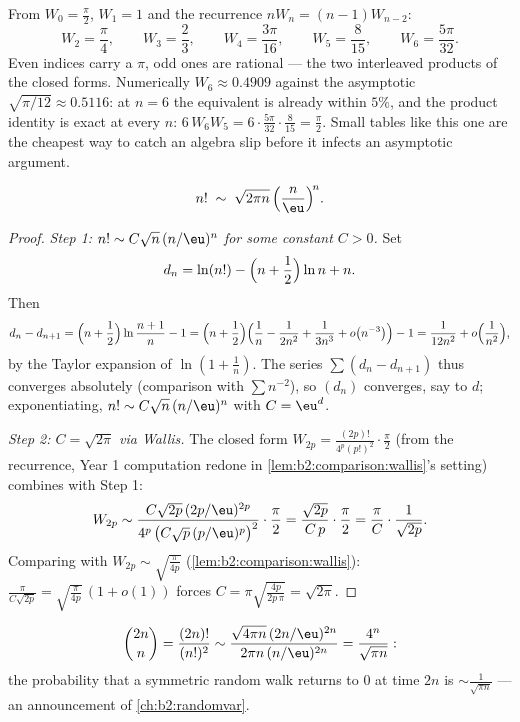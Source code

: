 \begin{example}\label{ex:b2:comparison:wallisvalues}
From $W_0 = \frac\pi2$, $W_1 = 1$ and the recurrence $nW_n =
(n-1)W_{n-2}$:
\[
W_2 = \frac\pi4, \qquad
W_3 = \frac23, \qquad
W_4 = \frac{3\pi}{16}, \qquad
W_5 = \frac{8}{15}, \qquad
W_6 = \frac{5\pi}{32}.
\]
Even indices carry a $\pi$, odd ones are rational --- the two
interleaved products of the closed forms. Numerically $W_6
\approx 0.4909$ against the asymptotic
$\sqrt{\pi/12} \approx 0.5116$: at $n = 6$ the equivalent is
already within $5\%$, and the product identity is exact at every
$n$: $6\,W_6W_5 = 6\cdot\frac{5\pi}{32}\cdot\frac8{15} =
\frac\pi2$. Small tables like this one are the cheapest way to
catch an algebra slip before it infects an asymptotic argument.
\end{example}

\begin{theorem}[Stirling]\label{thm:b2:comparison:stirling}
\[
n! \;\sim\; \sqrt{2\pi n}\, \Bigl(\frac{n}{\eu}\Bigr)^{\!n}
.\index{Stirling's formula}
\]
\end{theorem}

\begin{proof}
\emph{Step 1: $n! \sim C \sqrt n\, (n/\eu)^n$ for some constant $C >
0$.} Set
\[
d_n = \ln(n!) - \Bigl(n + \frac12\Bigr)\ln n + n .
\]
Then
\[
d_n - d_{n+1}
= \Bigl(n + \frac12\Bigr) \ln\frac{n+1}{n} - 1
= \Bigl(n + \frac12\Bigr)\Bigl(\frac1n - \frac{1}{2n^2} +
\frac{1}{3n^3} + o\bigl(n^{-3}\bigr)\Bigr) - 1
= \frac{1}{12n^2} + o\Bigl(\frac{1}{n^2}\Bigr),
\]
by the Taylor expansion of $\ln(1 + \frac1n)$. The series $\sum (d_n
- d_{n+1})$ thus converges absolutely (comparison with $\sum
n^{-2}$), so $(d_n)$ converges, say to $d$; exponentiating, $n! \sim
C\sqrt n\,(n/\eu)^n$ with $C = \eu^{d}$.

\emph{Step 2: $C = \sqrt{2\pi}$ via Wallis.} The closed form $W_{2p}
= \frac{(2p)!}{4^p (p!)^2}\cdot\frac\pi2$ (from the recurrence,
Year 1 computation redone in \cref{lem:b2:comparison:wallis}'s
setting) combines with Step 1:
\[
W_{2p} \sim \frac{C\sqrt{2p}\,(2p/\eu)^{2p}}
{4^p\,\bigl(C\sqrt p\,(p/\eu)^p\bigr)^2}\cdot\frac{\pi}{2}
= \frac{\sqrt{2p}}{C\,p}\cdot\frac{\pi}{2}
= \frac{\pi}{C}\cdot\frac{1}{\sqrt{2p}} .
\]
Comparing with $W_{2p} \sim \sqrt{\frac{\pi}{4p}}$
(\cref{lem:b2:comparison:wallis}): $\frac{\pi}{C\sqrt{2p}} =
\sqrt{\frac{\pi}{4p}}\,(1 + o(1))$ forces $C = \pi
\sqrt{\frac{4p}{2p\,\pi}} = \sqrt{2\pi}$.
\end{proof}

\begin{example}\label{ex:b2:comparison:centralbinomial}
\[
\binom{2n}{n} = \frac{(2n)!}{(n!)^2}
\sim \frac{\sqrt{4\pi n}\,(2n/\eu)^{2n}}{2\pi n\,(n/\eu)^{2n}}
= \frac{4^n}{\sqrt{\pi n}} :
\]
the probability that a symmetric random walk returns to $0$ at time
$2n$ is $\sim \frac{1}{\sqrt{\pi n}}$ --- an announcement of
\cref{ch:b2:randomvar}.
\end{example}

